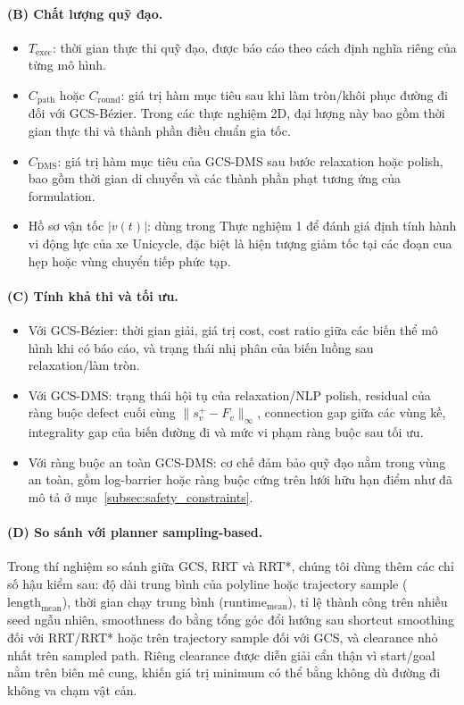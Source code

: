 \paragraph*{(B) Chất lượng quỹ đạo.}
\begin{itemize}
    \item $T_{\text{exec}}$: thời gian thực thi quỹ đạo, được báo cáo theo cách định nghĩa riêng của từng mô hình.
    \item $C_{\text{path}}$ hoặc $C_{\text{round}}$: giá trị hàm mục tiêu sau khi làm tròn/khôi phục đường đi đối với GCS-Bézier. Trong các thực nghiệm 2D, đại lượng này bao gồm thời gian thực thi và thành phần điều chuẩn gia tốc.
    \item $C_{\text{DMS}}$: giá trị hàm mục tiêu của GCS-DMS sau bước relaxation hoặc polish, bao gồm thời gian di chuyển và các thành phần phạt tương ứng của formulation.
    \item Hồ sơ vận tốc $|v(t)|$: dùng trong Thực nghiệm 1 để đánh giá định tính hành vi
          động lực của xe Unicycle, đặc biệt là hiện tượng giảm tốc tại các đoạn cua hẹp
          hoặc vùng chuyển tiếp phức tạp.
\end{itemize}

\paragraph*{(C) Tính khả thi và tối ưu.}
\begin{itemize}
    \item Với GCS-Bézier: thời gian giải, giá trị cost, cost ratio giữa các biến thể mô
          hình khi có báo cáo, và trạng thái nhị phân của biến luồng sau relaxation/làm
          tròn.
    \item Với GCS-DMS: trạng thái hội tụ của relaxation/NLP polish, residual của ràng
          buộc defect cuối cùng $\|s_v^+ - F_v\|_\infty$, connection gap giữa các vùng
          kề, integrality gap của biến đường đi và mức vi phạm ràng buộc sau tối ưu.
    \item Với ràng buộc an toàn GCS-DMS: cơ chế đảm bảo quỹ đạo nằm trong vùng an toàn,
          gồm log-barrier hoặc ràng buộc cứng trên lưới hữu hạn điểm như đã mô tả ở
          mục~\ref{subsec:safety_constraints}.
\end{itemize}

\paragraph*{(D) So sánh với planner sampling-based.}
Trong thí nghiệm so sánh giữa GCS, RRT và RRT*, chúng tôi dùng thêm các chỉ số
hậu kiểm sau: độ dài trung bình của polyline hoặc trajectory sample
($\text{length}_{\text{mean}}$), thời gian chạy trung bình
($\text{runtime}_{\text{mean}}$), tỉ lệ thành công trên nhiều seed ngẫu nhiên,
smoothness đo bằng tổng góc đổi hướng sau shortcut smoothing đối với RRT/RRT*
hoặc trên trajectory sample đối với GCS, và clearance nhỏ nhất trên sampled path.
Riêng clearance được diễn giải cẩn thận vì start/goal nằm trên biên mê cung,
khiến giá trị minimum có thể bằng không dù đường đi không va chạm vật cản.

